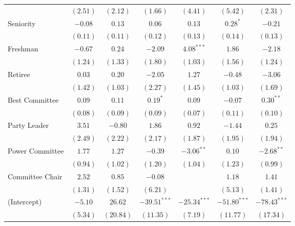 \documentclass[12pt]{article}
\begin{document}
\begin{table}
\begin{center}
\begin{tabular}{l c c c c c c }
			& $(2.51)$      & $(2.12)$      & $(1.66)$       & $(4.41)$       & $(5.42)$       & $(2.31)$       \\
			Seniority      & $-0.08$       & $0.13$        & $0.06$         & $0.13$         & $0.28^{*}$     & $-0.21$        \\
			& $(0.11)$      & $(0.11)$      & $(0.12)$       & $(0.13)$       & $(0.14)$       & $(0.13)$       \\
			Freshman         & $-0.67$       & $0.24$        & $-2.09$        & $4.08^{***}$   & $1.86$         & $-2.18$        \\
			& $(1.24)$      & $(1.33)$      & $(1.80)$       & $(1.03)$       & $(1.56)$       & $(1.24)$       \\
			Retiree           & $0.03$        & $0.20$        & $-2.05$        & $1.27$         & $-0.48$        & $-3.06$        \\
			& $(1.42)$      & $(1.03)$      & $(2.27)$       & $(1.45)$       & $(1.03)$       & $(1.69)$       \\
			Best Committee      & $0.09$        & $0.11$        & $0.19^{*}$     & $0.09$         & $-0.07$        & $0.30^{**}$    \\
			& $(0.08)$      & $(0.09)$      & $(0.09)$       & $(0.07)$       & $(0.11)$       & $(0.10)$       \\
		    Party Leader      & $3.51$        & $-0.80$       & $1.86$         & $0.92$         & $-1.44$        & $0.25$         \\
		    & $(2.49)$      & $(2.22)$      & $(2.17)$       & $(1.87)$       & $(1.95)$       & $(1.94)$       \\
			Power Committee       & $1.77$        & $1.27$        & $-0.39$        & $-3.06^{**}$   & $0.10$         & $-2.68^{**}$   \\
			& $(0.94)$      & $(1.02)$      & $(1.20)$       & $(1.04)$       & $(1.23)$       & $(0.99)$       \\
			Committee Chair      & $2.52$        & $0.85$        & $-0.08$        &                & $1.18$         & $1.41$         \\
			& $(1.31)$      & $(1.52)$      & $(6.21)$       &                & $(5.13)$       & $(1.41)$       \\
			(Intercept)     & $-5.10$       & $26.62$       & $-39.51^{***}$ & $-25.34^{***}$ & $-51.80^{***}$ & $-78.43^{***}$ \\
			& $(5.34)$      & $(20.84)$     & $(11.35)$      & $(7.19)$       & $(11.77)$      & $(17.34)$      \\
						

\end{tabular}
\end{center}
\end{table}
\end{document}
